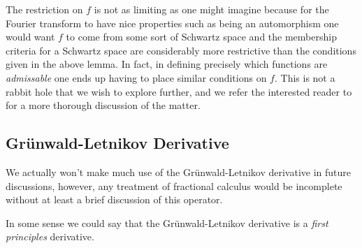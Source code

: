 The restriction on $ f $ is not as limiting as one might imagine because for the Fourier transform to have nice properties such as being an automorphism one would want $ f $ to come from some sort of Schwartz space and the membership criteria for a Schwartz space are considerably more restrictive than the conditions given in the above lemma. In fact, in defining precisely which functions are \emph{admissable} one ends up having to place similar conditions on $ f $. This is not a rabbit hole that we wish to explore further, and we refer the interested reader to \cite{Samko1993} for a more thorough discussion of the matter. 

\subsection{Gr{\"u}nwald-Letnikov Derivative} 
We actually won't make much use of the Gr{\"u}nwald-Letnikov derivative in future discussions, however, any treatment of fractional calculus would be incomplete without at least a brief discussion of this operator.

In some sense we could say that the Gr{\"u}nwald-Letnikov derivative is a \emph{first principles} derivative. 

